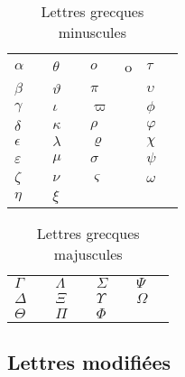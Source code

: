 \begin{table}
  \caption{Lettres grecques minuscules}
  \label{tab:math:grecques}
  \begin{tabularx}{1.0\linewidth}{lXlXlXlX}
    $\alpha$      & \cmd{\alpha}      & $\theta$    & \cmd{\theta} &
    $o$           & o                 & $\tau$      & \cmd{\tau} \\
    $\beta$       & \cmd{\beta}       & $\vartheta$ & \cmd{\vartheta} &
    $\pi$         & \cmd{\pi}         & $\upsilon$  & \cmd{\upsilon} \\
    $\gamma$      & \cmd{\gamma}      & $\iota$     & \cmd{\iota} &
    $\varpi$      & \cmd{\varpi}      & $\phi$      & \cmd{\phi} \\
    $\delta$      & \cmd{\delta}      & $\kappa$    & \cmd{\kappa} &
    $\rho$        & \cmd{\rho}        & $\varphi$   & \cmd{\varphi} \\
    $\epsilon$    & \cmd{\epsilon}    & $\lambda$   & \cmd{\lambda} &
    $\varrho$     & \cmd{\varrho}     & $\chi$      & \cmd{\chi} \\
    $\varepsilon$ & \cmd{\varepsilon} & $\mu$       & \cmd{\mu} &
    $\sigma$      & \cmd{\sigma}      & $\psi$      & \cmd{\psi} \\
    $\zeta$       & \cmd{\zeta}       & $\nu$       & \cmd{\nu} &
    $\varsigma$   & \cmd{\varsigma}   & $\omega$    & \cmd{\omega} \\
    $\eta$        & \cmd{\eta}        & $\xi$       & \cmd{\xi}
  \end{tabularx}
\end{table}

\begin{table}
  \caption{Lettres grecques majuscules}
  \label{tab:math:Grecques}
  \begin{tabularx}{1.0\linewidth}{lXlXlXlX}
    $\Gamma$    & \cmd{\Gamma}   &
    $\Lambda$   & \cmd{\Lambda}  &
    $\Sigma$    & \cmd{\Sigma}   &
    $\Psi$      & \cmd{\Psi}     \\
    $\Delta$    & \cmd{\Delta}   &
    $\Xi$       & \cmd{\Xi}      &
    $\Upsilon$  & \cmd{\Upsilon} &
    $\Omega$    & \cmd{\Omega}   \\
    $\Theta$    & \cmd{\Theta}   &
    $\Pi$       & \cmd{\Pi}      &
    $\Phi$      & \cmd{\Phi}
  \end{tabularx}
\end{table}

\subsection{Lettres modifiées}
\label{tab:math:symboles:mathcal}

